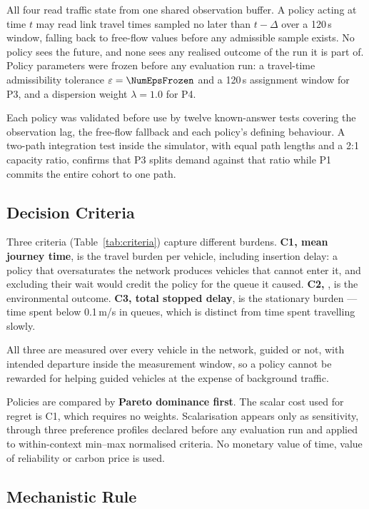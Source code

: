 All four read traffic state from one shared observation buffer. A policy acting
at time $t$ may read link travel times sampled no later than $t-\Delta$ over a
120\,s window, falling back to free-flow values before any admissible sample
exists. No policy sees the future, and none sees any realised outcome of the
run it is part of. Policy parameters were frozen before any evaluation run: a
travel-time admissibility tolerance $\varepsilon=\NumEpsFrozen$ and a 120\,s
assignment window for P3, and a dispersion weight $\lambda=1.0$ for P4.

Each policy was validated before use by twelve known-answer tests covering the
observation lag, the free-flow fallback and each policy's defining behaviour. A
two-path integration test inside the simulator, with equal path lengths and a
2:1 capacity ratio, confirms that P3 splits demand \NumTwoPathRatio{} against
that ratio while P1 commits the entire cohort to one path.

\subsection{Decision Criteria}
\label{sec:criteria}

Three criteria (Table~\ref{tab:criteria}) capture different burdens.
\textbf{C1, mean journey time}, is the travel burden per vehicle, including
insertion delay: a policy that oversaturates the network produces vehicles that
cannot enter it, and excluding their wait would credit the policy for the queue
it caused. \textbf{C2, \CO{}}, is the environmental outcome. \textbf{C3, total
stopped delay}, is the stationary burden --- time spent below 0.1\,m/s in
queues, which is distinct from time spent travelling slowly.

All three are measured over every vehicle in the network, guided or not, with
intended departure inside the measurement window, so a policy cannot be
rewarded for helping guided vehicles at the expense of background traffic.

Policies are compared by \textbf{Pareto dominance first}. The scalar cost used
for regret is C1, which requires no weights. Scalarisation appears only as
sensitivity, through three preference profiles declared before any evaluation
run and applied to within-context min--max normalised criteria. No monetary
value of time, value of reliability or carbon price is used.

\subsection{Mechanistic Rule}

